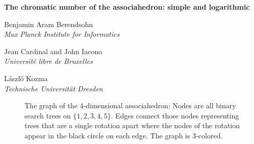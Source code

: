 \documentclass[a4paper]{article}
\begin{document}
\begin{center}
    
{ \bf \large
The chromatic number  of the associahedron: simple and logarithmic
}

\vspace{5pt}
Benjamin Aram Berendsohn \\
{\it Max Planck Institute for Informatics}

\vspace{5pt}
Jean Cardinal and
John Iacono \\ {\it Université libre de Bruxelles}

\vspace{5pt}
László Kozma \\{\it Technische Universität Dresden}\\%

\end{center}




\begin{abstract}
  Addario-Berry, Reed,  Scott, and Wood  (JoCG 2026) proved that the $n$-dimensional associahedron has chromatic number at most $22500\cdot\log_3 n+O(1)$. We present a much simpler proof that the chromatic number of the $n-1$-dimensional associahedron is at most $6 \log_2 n + 18$. Since this paper's appearance as a preliminary abstract in the Japan Conference on Discrete and Computational Geometry, Graphs, and Games held from September 7-10, 2026, the bound has been improved to $O(\log \log n)$ by Oum and Wood (arXiv September 30, 2026). It is hoped that the simple method here could give insights to further improvements.
\end{abstract}

\begin{figure}[h]
\begin{center}
\resizebox{10cm}{!}{}
\end{center}
\caption{The graph of the $4$-dimensional associahedron: Nodes are all binary search trees on $\{1,2,3,4,5\}$. Edges connect those nodes representing trees that are a single rotation apart where the nodes of the rotation appear in the black circle on each edge. The graph is 3-colored. 
}
\end{figure}
\end{document}
